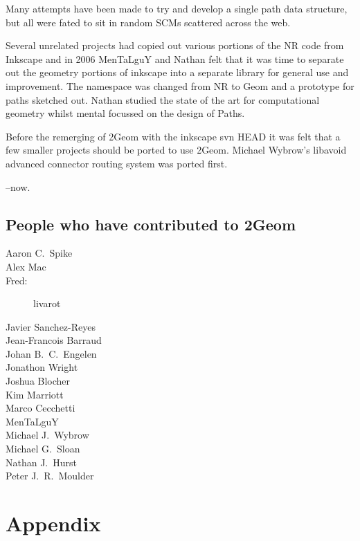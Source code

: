 \documentclass[openany]{book}
\begin{document}
Many attempts have been made to try and develop a single path data
structure, but all were fated to sit in random SCMs scattered across
the web.

Several unrelated projects had copied out various portions of the NR
code from Inkscape and in 2006 MenTaLguY and Nathan felt that it was
time to separate out the geometry portions of inkscape into a
separate library for general use and improvement.  The namespace was
changed from NR to Geom and a prototype for paths sketched out.
Nathan studied the state of the art for computational geometry whilst
mental focussed on the design of Paths.

Before the remerging of 2Geom with the inkscape svn HEAD it was felt
that a few smaller projects should be ported to use 2Geom.  Michael
Wybrow's libavoid advanced connector routing system was ported first.

--now.

\pagebreak

\section{People who have contributed to 2Geom}
\begin{description}
\item[Aaron C.\ Spike]
\item[Alex Mac]
\item[Fred:] livarot
\item[Javier Sanchez-Reyes]
\item[Jean-Francois Barraud]
\item[Johan B.\ C.\ Engelen]
\item[Jonathon Wright]
\item[Joshua Blocher]
\item[Kim Marriott]
\item[Marco Cecchetti]
\item[MenTaLguY]
\item[Michael J.\ Wybrow]
\item[Michael G.\ Sloan]
\item[Nathan J.\ Hurst]
\item[Peter J.\ R.\ Moulder]
\end{description}

\chapter{Appendix}
\renewcommand{\thesection}{\Alph{section}}
\end{document}
